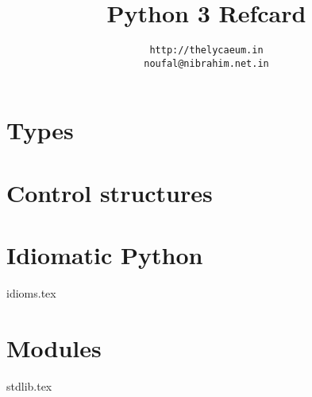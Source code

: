 \documentclass{refsheet}
\title{Python 3 Refcard}
\author {\texttt{http://thelycaeum.in}  \\ \texttt{noufal@nibrahim.net.in}}
\date{}
\begin{document}
\maketitle

\section{Types}







\section{Control structures}







\section{Idiomatic Python}
 {idioms.tex}

\pagebreak
\section{Modules}
 {stdlib.tex}
\end{document}
